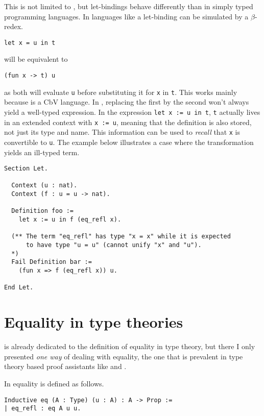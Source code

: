 This is not limited to \Coq, but let-bindings behave differently than in
simply typed programming languages. In languages like \ocaml a let-binding can
be simulated by a \(\beta\)-redex.
\begin{verbatim}
let x = u in t
\end{verbatim}
will be equivalent to
\begin{verbatim}
(fun x -> t) u
\end{verbatim}
as both will evaluate \texttt{u} before substituting it for
\texttt{x} in \texttt{t}. This works mainly because
\ocaml is a \acrshort{CbV} language.
In \Coq, replacing the first by the second won't always yield a well-typed
expression.
In the \Coq expression \texttt{let x := u in t}, \texttt{t}
actually lives in an extended context with \texttt{x := u}, meaning
that the definition is also stored, not just its type and name. This information
can be used to \emph{recall} that \texttt{x} is convertible to
\texttt{u}. The example below illustrates a case where the
transformation yields an ill-typed term.
\begin{verbatim}
Section Let.

  Context (u : nat).
  Context (f : u = u -> nat).

  Definition foo :=
    let x := u in f (eq_refl x).

  (** The term "eq_refl" has type "x = x" while it is expected
      to have type "u = u" (cannot unify "x" and "u").
  *)
  Fail Definition bar :=
    (fun x => f (eq_refl x)) u.

End Let.
\end{verbatim}

\section{Equality in type theories}

 is already dedicated to the definition of equality in
type theory, but there I only presented \emph{one way} of dealing with equality,
the one that is prevalent in type theory based proof assistants like \Agda and
\Coq.

In \Coq equality is defined as follows.
\begin{verbatim}
Inductive eq (A : Type) (u : A) : A -> Prop :=
| eq_refl : eq A u u.
\end{verbatim}


